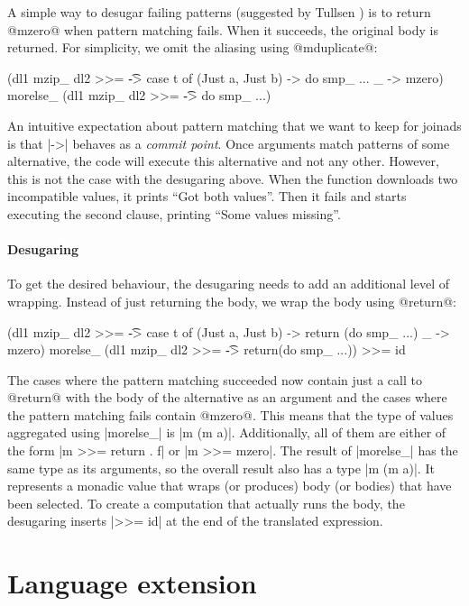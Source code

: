 \documentclass[preprint]{sigplanconf}
\begin{document}
A simple way to desugar failing patterns (suggested by Tullsen \cite{firstlcasspats}) is to return 
@mzero@ when pattern matching fails. When it succeeds, the original body is returned. For simplicity,
we omit the aliasing using @mduplicate@:

\begin{code}
(dl1 mzip_ dl2 >>= \t -> case t of 
    (Just a, Just b) -> do smp_ ...
    _ -> mzero) morelse_
(dl1 mzip_ dl2 >>= \t -> do smp_ ...)
\end{code}
An intuitive expectation about pattern matching that we want to keep for joinads is that 
|->| behaves as a \textit{commit point}. Once arguments match patterns of some alternative, the 
code will execute this alternative and not any other. However, this is not the case with the
desugaring above. When the function downloads two incompatible values, it prints ``Got both values''.
Then it fails and starts executing the second clause, printing ``Some values missing''.

\paragraph{Desugaring} To get the desired behaviour, the desugaring needs to add an additional
level of wrapping. Instead of just returning the body, we wrap the body using @return@:

\begin{code}
(dl1 mzip_ dl2 >>= \t -> case t of 
    (Just a, Just b) -> return (do smp_ ...)
    _ -> mzero) morelse_
(dl1 mzip_ dl2 >>= \t -> 
    return(do smp_ ...)) >>= id
\end{code}
The cases where the pattern matching succeeded now contain just a call to @return@ with the body
of the alternative as an argument and the cases where the pattern matching fails contain @mzero@.
This means that the type of values aggregated using |morelse_| is |m (m a)|. Additionally,
all of them are either of the form |m >>= return . f| or |m >>= mzero|.
The result of |morelse_| has the same type as its arguments, so the overall result also has a type
|m (m a)|. It represents a monadic value that wraps (or produces) body (or bodies) that have
been selected. To create a computation that actually runs the body, the desugaring inserts 
|>>= id| at the end of the translated expression. 


\section{Language extension}
\label{sec:extension}
\end{document}
